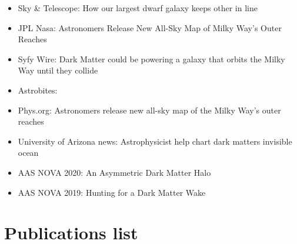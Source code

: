 \documentclass[UTF8]{article}
\begin{document}
\begin{itemize}
  \setlength\itemsep{0.0em}
  \renewcommand\labelitemi{$\cdot$}
  \item Sky \& Telescope: How our largest dwarf galaxy keeps other in line
  \item JPL Nasa: Astronomers Release New All-Sky Map of Milky Way’s Outer Reaches
  \item Syfy Wire: Dark Matter could be powering a galaxy that orbits the Milky Way until they collide
  \item Astrobites: 
  \item Phys.org: Astronomers release new all-sky map of the Milky Way's outer reaches
 \item University of Arizona news: Astrophysicist help chart dark matters invisible ocean
 \item AAS NOVA 2020: An Asymmetric Dark Matter Halo
 \item AAS NOVA 2019: Hunting for a Dark Matter Wake

\end{itemize}




\section*{Publications list}
\end{document}
